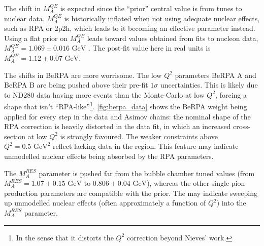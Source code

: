 The shift in $M_A^{QE}$ is expected since the ``prior'' central value is from tunes to nuclear data\cite{ccqe_tuning}. $M_A^{QE}$ is historically inflated\cite{k2k_ccqe_carbon,k2k_ccqe_oxygen,minos_ccqe_iron,miniboone_nu_ccqe} when not using adequate nuclear effects, such as RPA or 2p2h, which leads to it becoming an effective parameter instead. Using a flat prior on $M_A^{QE}$ leads toward values obtained from fits to nucleon data, $M_A^{QE}=1.069\pm0.016\text{ GeV}$ \cite{maqe_fit}. The post-fit value here in real units is $M_A^{QE}=1.12\pm0.07\text{ GeV}$.

The shifts in BeRPA are more worrisome. The low $Q^2$ parameters BeRPA A and BeRPA B are being pushed above their pre-fit $1\sigma$ uncertainties. This is likely due to ND280 data having more events than the Monte-Carlo at low $Q^2$, forcing a shape that isn't ``RPA-like''\footnote{In the sense that it distorts the $Q^2$ correction beyond Nieves'\cite{nieves2} work.}. \autoref{fig:berpa_data} shows the BeRPA weight being applied for every step in the data and Asimov chains: the nominal shape of the RPA correction is heavily distorted in the data fit, in which an increased cross-section at low $Q^2$ is strongly favoured. The weaker constraints above $Q^2=0.5\text{ GeV}^2$ reflect lacking data in the region. This feature may indicate unmodelled nuclear effects being absorbed by the RPA parameters.

The $M_A^{RES}$ parameter is pushed far from the bubble chamber tuned values (from $M_A^{RES}=1.07\pm0.15\text{ GeV}$ to $0.806\pm0.04\text{ GeV}$), whereas the other single pion production parameters are compatible with the prior. The may indicate sweeping up unmodelled nuclear effects (often approximately a function of $Q^2$) into the $M_A^{RES}$ parameter.

